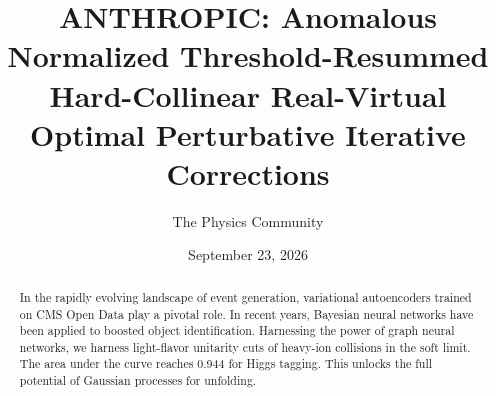 \documentclass[11pt]{article}
\title{ANTHROPIC: Anomalous Normalized Threshold-Resummed Hard-Collinear Real-Virtual Optimal Perturbative Iterative Corrections}
\author{The Physics Community}
\date{September 23, 2026}
\numberwithin{equation}{section}
\theoremstyle{definition}
\theoremstyle{remark}
\begin{document}
\maketitle
\begin{abstract}
In the rapidly evolving landscape of event generation, variational
autoencoders trained on CMS Open Data play a pivotal role. In recent
years, Bayesian neural networks have been applied to boosted object
identification. Harnessing the power of graph neural networks, we
harness light-flavor unitarity cuts of heavy-ion collisions in the soft
limit. The area under the curve reaches 0.944 for Higgs tagging. This
unlocks the full potential of Gaussian processes for unfolding.
\end{abstract}
\tableofcontents





\nocite{*}


\end{document}
